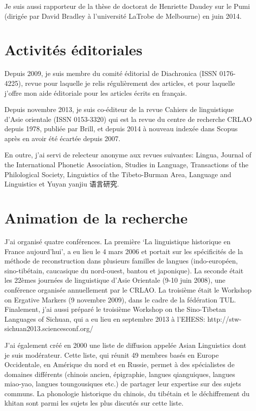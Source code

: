 \documentclass[oldfontcommands,oneside,a4paper,11pt]{memoir}
\newcommand{\zh}[1]{{\cn #1}}
\begin{document}
Je suis aussi rapporteur de la thèse de doctorat de Henriette Daudey sur le Pumi (dirigée par David Bradley à l'université LaTrobe de Melbourne) en juin 2014.
 \section{Activités éditoriales}
Depuis 2009, je suis membre du comité éditorial de Diachronica (ISSN 0176-4225), revue pour laquelle je relis régulièrement des articles, et pour laquelle j'offre mon aide éditoriale pour les articles écrits en français.


 Depuis novembre 2013, je suis co-éditeur de la revue Cahiers de linguistique d'Asie orientale (ISSN 0153-3320) qui est la revue du centre de recherche CRLAO depuis 1978,   publiée par Brill, et depuis 2014 à nouveau indexée dans Scopus  après en avoir été écartée depuis 2007.
 
 En outre, j'ai servi de relecteur anonyme aux revues suivantes:  Lingua, Journal of the International Phonetic Association, Studies in Language, Transactions of the Philological Society, Linguistics of the Tibeto-Burman Area, Language and Linguistics et  Yuyan yanjiu \zh{语言研究}.

\section{Animation de la recherche}
J’ai organisé quatre conférences. La première ‘La linguistique historique en France aujourd’hui’, a eu lieu le 4 mars 2006 et portait sur les spécificités de la méthode de reconstruction dans plusieurs familles de langues (indo-européen, sino-tibétain, caucasique du nord-ouest, bantou et japonique). La seconde était les 22èmes journées de linguistique d’Asie Orientale (9-10 juin 2008), une conférence organisée annuellement par le CRLAO. La troisième était le Workshop on Ergative Markers (9 novembre 2009), dans le cadre de la fédération TUL. Finalement, j'ai aussi préparé  le troisième Workshop on the Sino-Tibetan Languages of Sichuan, qui a eu lieu en septembre 2013 à l'EHESS: http://stw-sichuan2013.sciencesconf.org/

 

J’ai également créé en 2000 une liste de diffusion appelée Asian Linguistics dont je suis modérateur. Cette liste, qui réunit 49 membres basés en Europe Occidentale, en Amérique du nord et en Russie, permet à des spécialistes de domaines différents (chinois ancien, épigraphie, langues qianguiques, langues miao-yao, langues toungousiques etc.) de partager leur expertise sur des sujets communs. La phonologie historique du chinois, du tibétain et le déchiffrement du khitan sont parmi les sujets les plus discutés sur cette liste.
\end{document}
